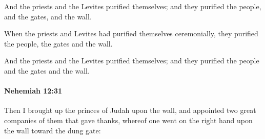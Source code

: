 			\begin{versebox}
					\item[BHS] 
					\item[LXX] 
					\item[ASV] And the priests and the Levites purified themselves; and they purified the people, and the gates, and the wall.
					\item[NIV] When the priests and Levites had purified themselves ceremonially, they purified the people, the gates and the wall.
					\item[NRSV] And the priests and the Levites purified themselves; and they purified the people and the gates and the wall.
			\end{versebox}

		\paragraph{Nehemiah 12:31} %
			\label{NEHEMIAH-12-31}

			Then I brought up the princes of Judah upon the wall, and appointed two great companies of them that gave thanks, whereof one went on the right hand upon the wall toward the dung gate:

